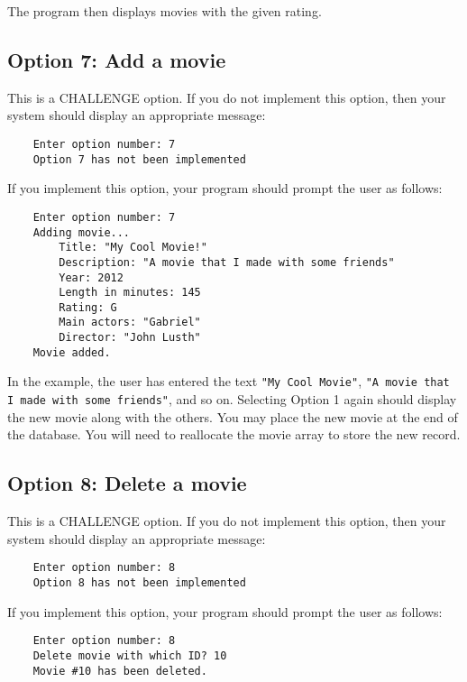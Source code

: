 \documentclass{article}
\begin{document}
The program then displays movies with the given rating.

\subsection*{Option 7: Add a movie}

This is a CHALLENGE option. If you do not implement this option, then
your system should display an appropriate message:

\begin{verbatim}
    Enter option number: 7
    Option 7 has not been implemented
\end{verbatim}

If you implement this option, your program should
prompt the user as follows:

\begin{verbatim}
    Enter option number: 7
    Adding movie... 
        Title: "My Cool Movie!"
        Description: "A movie that I made with some friends"
        Year: 2012
        Length in minutes: 145
        Rating: G
        Main actors: "Gabriel"
        Director: "John Lusth"
    Movie added.
\end{verbatim}

In the example, the user has entered the text \verb!"My Cool Movie"!,
\verb+"A movie that I made with some friends"+, and so on.
Selecting Option 1 again should display the new movie along with the others.
You may place the new movie at the end of the database.
You will need to reallocate the movie array to store the new record.

\subsection*{Option 8: Delete a movie}

This is a CHALLENGE option. If you do not implement this option, then
your system should display an appropriate message:

\begin{verbatim}
    Enter option number: 8
    Option 8 has not been implemented
\end{verbatim}

If you implement this option, your program should
prompt the user as follows:

\begin{verbatim}
    Enter option number: 8
    Delete movie with which ID? 10
    Movie #10 has been deleted.
\end{verbatim}
\end{document}
